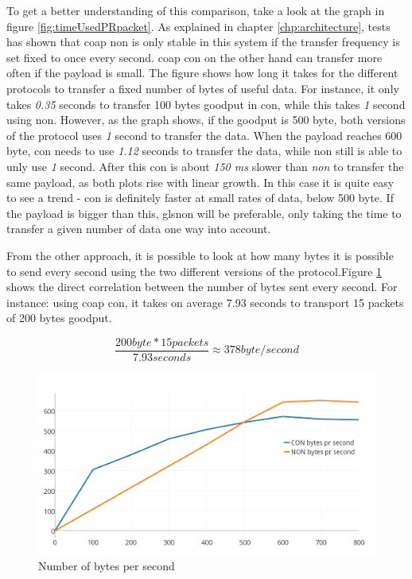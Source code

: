 To get a better understanding of this comparison, take a look at the graph in figure \ref{fig:timeUsedPRpacket}. As explained in chapter \ref{chp:architecture}, tests has shown that \gls{coap} \gls{non} is only stable in this system if the transfer frequency is set fixed to once every second. \gls{coap} \gls{con} on the other hand can transfer more often if the \gls{payload} is small. The figure shows how long it takes for the different protocols to transfer a fixed number of bytes of useful data. For instance, it only takes \textit{0.35} seconds to transfer 100 bytes goodput in \gls{con}, while this takes \textit{1} second using \gls{non}. However, as the graph shows, if the goodput is 500 byte, both versions of the protocol uses \textit{1} second to transfer the data. When the \gls{payload} reaches 600 byte, \gls{con} needs to use \textit{1.12} seconds to transfer the data, while \gls{non} still is able to unly use \textit{1} second. After this \gls{con} is about \textit{150 ms} slower than \textit{non} to transfer the same payload, as both plots rise with linear growth. In this case it is quite easy to see a trend - \gls{con} is definitely faster at small rates of data, below 500 byte. If the payload is bigger than this, gls{non} will be preferable, only taking the time to transfer a given number of data one way into account. 

From the other approach, it is possible to look at how many bytes it is possible to send every second using the two different versions of the protocol.Figure \ref{fig:bytesPRSecond2}  shows the direct correlation between the number of bytes sent every second. For instance: using \gls{coap} \gls{con}, it takes on average 7.93 seconds to transport 15 packets of 200 bytes goodput. 

\begin{equation} \label{CONexampleFig411}
	\frac{200 byte * 15 packets}{7.93 seconds} \approx 378 byte/second
\end{equation}


\begin{figure}[ht]
    \centering
    \includegraphics[scale=1.0]{bytesPRSecond2.png}    
    \caption{Number of bytes per second}
    \label{fig:bytesPRSecond2}
\end{figure}



